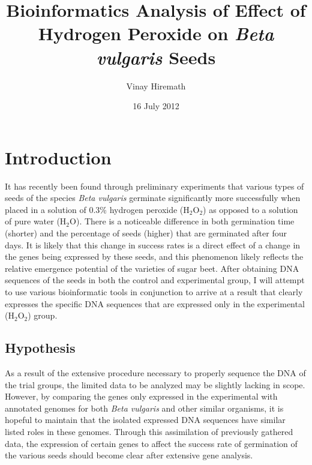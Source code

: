 \documentclass{article}
\begin{document}
\title{Bioinformatics Analysis of Effect of Hydrogen Peroxide on \emph{Beta vulgaris} Seeds}
\author{Vinay Hiremath}
\date{16 July 2012}
\maketitle
\section{Introduction}
	It has recently been found through preliminary experiments that various types of seeds of the species \emph{Beta vulgaris} germinate significantly more successfully when placed in a solution of 0.3\% hydrogen peroxide (H$_{2}$O$_{2}$) as opposed to a solution of pure water (H$_{2}$O). There is a noticeable difference in both germination time (shorter) and the percentage of seeds (higher) that are germinated after four days. It is likely that this change in success rates is a direct effect of a change in the genes being expressed by these seeds, and this phenomenon likely reflects the relative emergence potential of the varieties of sugar beet. After obtaining DNA sequences of the seeds in both the control and experimental group, I will attempt to use various bioinformatic tools in conjunction to arrive at a result that clearly expresses the specific DNA sequences that are expressed only in the experimental (H$_{2}$O$_{2}$) group.
	\subsection{Hypothesis}
	As a result of the extensive procedure necessary to properly sequence the DNA of the trial groups, the limited data to be analyzed may be slightly lacking in scope. However, by comparing the genes only expressed in the experimental with annotated genomes for both \emph{Beta vulgaris} and other similar organisms, it is hopeful to maintain that the isolated expressed DNA sequences have similar listed roles in these genomes. Through this assimilation of previously gathered data, the expression of certain genes to affect the success rate of germination of the various seeds should become clear after extensive gene analysis.
\end{document}
